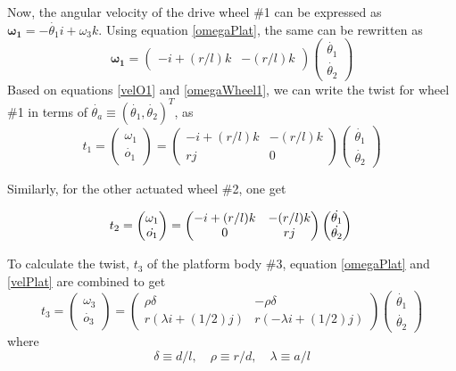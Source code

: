 Now, the angular velocity of the drive wheel \#1 can be expressed as $\bm{\omega_1}=-\dot{\theta_1}i+\omega_3k$. Using equation \ref{omegaPlat}, the same can be rewritten as 
\begin{equation}
\label{omegaWheel1}
\bm{\omega_1}=\begin{pmatrix}
-i+(r/l)k & -(r/l)k
\end{pmatrix}
\begin{pmatrix}
\dot{\theta_1}\\\dot{\theta_2}
\end{pmatrix}
\end{equation}
Based on  equations \ref{velO1} and \ref{omegaWheel1}, we can write the twist for wheel \#1 in terms of $\dot{\theta_a}\equiv (\dot{\theta_1},\dot{\theta_2})^T$, as 
\begin{equation}
\label{twist1}
t_1=\begin{pmatrix}
\omega_1\\\dot{o_1}
\end{pmatrix}=
\begin{pmatrix}
-i+(r/l)k & -(r/l)k\\ rj & 0
\end{pmatrix}
\begin{pmatrix}
\dot{\theta_1}\\\dot{\theta_2}
\end{pmatrix}
\end{equation}

Similarly, for the other actuated wheel \#2, one get

\begin{equation}
\label{twist2}
t_2=\begin{pmatrix}
\omega_1\\\dot{o_1}
\end{pmatrix}=
		\begin{pmatrix}
		-i+(r/l)k & -(r/l)k\\  0 &rj
		\end{pmatrix}
		\begin{pmatrix}
		\dot{\theta_1}\\\dot{\theta_2}
		\end{pmatrix}\\
		\end{equation}

To calculate the twist, $t_3$ of the platform body \#3, equation \ref{omegaPlat} and \ref{velPlat} are combined to get
\begin{equation}
\label{twist3}
t_3=\begin{pmatrix}
\omega_3\\\dot{o_3}
\end{pmatrix}=
\begin{pmatrix}
\rho\delta & -\rho\delta\\
r(\lambda i+(1/2)j) & r(-\lambda i+(1/2)j)
\end{pmatrix}
\begin{pmatrix}
\dot{\theta_1}\\\dot{\theta_2}
\end{pmatrix}
\end{equation}
where
\[ \delta\equiv d/l, \quad \rho \equiv r/d, \quad \lambda \equiv a/l \]

